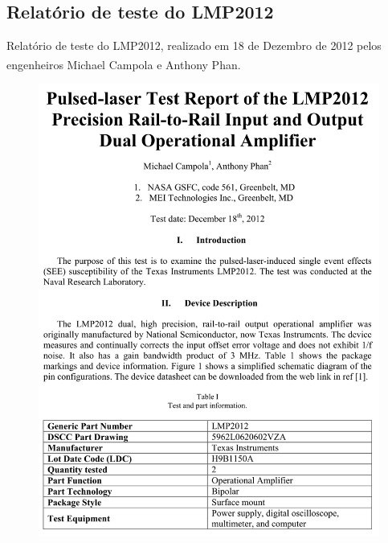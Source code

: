 \documentclass[
	12pt,				%
	openright,			%
	oneside,			%
	a4paper,			%
	english,			%
	french,				%
	spanish,			%
	brazil,				%
	oldfontcommands
	]{abntex2}
\begin{document}
\begin{anexosenv}
\chapter[Relatório de teste do LMP2012]{Relatório de teste do LMP2012}		
	
	Relatório de teste do LMP2012, realizado em 18 de Dezembro de 2012 pelos engenheiros Michael Campola e Anthony Phan.\textsuperscript{\cite{LMP2012}}
	
		\begin{figure}[th]
		\centering
		\includegraphics[width=0.85\linewidth]{./anexos/lmp2012_1}	
	\end{figure}	
	

\end{anexosenv}
\end{document}
